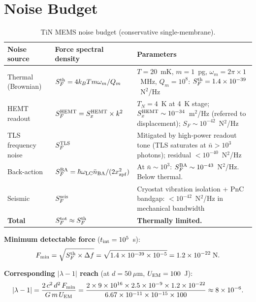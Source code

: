 \documentclass[11pt]{article}
\newcommand{\ee}[1]{\times 10^{#1}}
\newcommand{\lbone}{|\lambda - 1|}
\theoremstyle{definition}
\theoremstyle{remark}
\begin{document}
\section{Noise Budget}

\begin{table}[H]
\centering
\caption{TiN MEMS noise budget (conservative single-membrane).}
\renewcommand{\arraystretch}{1.3}
\begin{tabular}{@{}p{4cm}p{3cm}p{5cm}@{}}
\toprule
\textbf{Noise source} & \textbf{Force spectral density}
& \textbf{Parameters} \\
\midrule
\rowcolor{rowhi}
Thermal (Brownian) & $S_F^{\rm th} = 4 k_B T m \omega_m / Q_m$
& $T = 20$~mK, $m = 1$~pg, $\omega_m = 2\pi \times 1$~MHz,
  $Q_m = 10^8$: $S_F^{\rm th} = 1.4\ee{-39}$~N$^2$/Hz \\
\rowcolor{rowmed}
HEMT readout & $S_F^{\rm HEMT} = S_x^{\rm HEMT} \times k^2$
& $T_N = 4$~K at 4~K stage; $S_x^{\rm HEMT}
  \sim 10^{-34}$~m$^2$/Hz (referred to displacement);
  $S_F \sim 10^{-42}$~N$^2$/Hz \\
\rowcolor{rowmed}
TLS frequency noise & $S_F^{\rm TLS}$
& Mitigated by high-power readout tone (TLS saturates at
  $\bar{n} > 10^3$ photons); residual $< 10^{-40}$~N$^2$/Hz \\
\rowcolor{rowok}
Back-action & $S_F^{\rm BA} = \hbar \omega_{\rm LC} \bar{n}_{\rm BA}
  / (2 x_{\rm zpf}^2)$
& At $\bar{n} \sim 10^3$: $S_F^{\rm BA}
  \sim 10^{-43}$~N$^2$/Hz. Below thermal. \\
\rowcolor{rowok}
Seismic & $S_F^{\rm seis}$
& Cryostat vibration isolation + PnC bandgap: $< 10^{-42}$~N$^2$/Hz
  in mechanical bandwidth \\
\midrule
\textbf{Total} & $S_F^{\rm tot} \approx S_F^{\rm th}$
& \textbf{Thermally limited.} \\
\bottomrule
\end{tabular}
\end{table}

\textbf{Minimum detectable force} ($t_{\rm int} = 10^5$~s):
\begin{equation}
F_{\rm min} = \sqrt{S_F^{\rm th} \times \Delta f}
= \sqrt{1.4\ee{-39} \times 10^{-5}}
= 1.2\ee{-22}\;\text{N}.
\end{equation}

\textbf{Corresponding $\lbone$ reach} (at $d = 50~\mu$m,
$U_{\rm EM} = 100$~J):
\begin{equation}
\lbone = \frac{2\,c^2\,d^2\,F_{\rm min}}{G\,m\,U_{\rm EM}}
= \frac{2 \times 9\ee{16} \times 2.5\ee{-9} \times 1.2\ee{-22}}
{6.67\ee{-11} \times 10^{-15} \times 100}
\approx 8\ee{-6}.
\end{equation}
\end{document}
